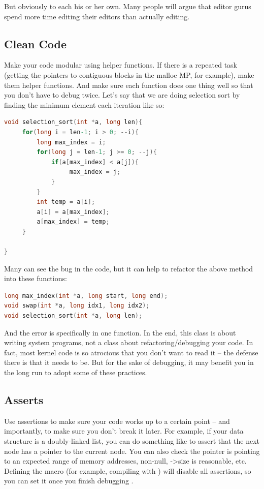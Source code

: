 But obviously to each his or her own.
Many people will argue that editor gurus spend more time editing their editors than actually editing.

\subsection{Clean Code}

Make your code modular using helper functions. If there is a repeated task (getting the pointers to contiguous blocks in the malloc MP, for example), make them helper functions.
And make sure each function does one thing well so that you don't have to debug twice.
Let's say that we are doing selection sort by finding the minimum element each iteration like so:

\begin{lstlisting}[language=C]
void selection_sort(int *a, long len){
     for(long i = len-1; i > 0; --i){
         long max_index = i;
         for(long j = len-1; j >= 0; --j){
             if(a[max_index] < a[j]){
                  max_index = j;
             }
         }
         int temp = a[i];
         a[i] = a[max_index];
         a[max_index] = temp;
     }

}
\end{lstlisting}

Many can see the bug in the code, but it can help to refactor the above method into these functions:

\begin{lstlisting}[language=C]
long max_index(int *a, long start, long end);
void swap(int *a, long idx1, long idx2);
void selection_sort(int *a, long len);
\end{lstlisting}

And the error is specifically in one function.
In the end, this class is about writing system programs, not a class about refactoring/debugging your code.
In fact, most kernel code is so atrocious that you don't want to read it -- the defense there is that it needs to be.
But for the sake of debugging, it may benefit you in the long run to adopt some of these practices.

\subsection{Asserts}

Use assertions to make sure your code works up to a certain point -- and importantly, to make sure you don't break it later.
For example, if your data structure is a doubly-linked list, you can do something like  to assert that the next node has a pointer to the current node.
You can also check the pointer is pointing to an expected range of memory addresses, non-null, -\textgreater{}size is reasonable, etc.
Defining the  macro (for example, compiling with ) will disable all assertions, so you can set it once you finish debugging \cite{cplusplus_assert}.

